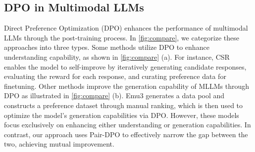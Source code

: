 \subsection{DPO in Multimodal LLMs}
Direct Preference Optimization (DPO) \citep{rafailov2024direct,zhang2024itercomp,yang2025supercorrect,yang2025reasonflux} enhances the performance of multimodal LLMs through the post-training process. In \cref{fig:compare}, we categorize these approaches into three types. Some methods \citep{zhou2024aligning, zhou2024calibrated, he2024self, zhang2024critic} utilize DPO to enhance understanding capability, as shown in \cref{fig:compare} (a). For instance, CSR \citep{zhou2024calibrated} enables the model to self-improve by iteratively generating candidate responses, evaluating the reward for each response, and curating preference data for finetuning. Other methods \citep{wang2024emu3} improve the generation capability of MLLMs through DPO as illustrated in \cref{fig:compare} (b). Emu3 \citep{wang2024emu3} generates a data pool and constructs a preference dataset through manual ranking, which is then used to optimize the model's generation capabilities via DPO. However, these models focus exclusively on enhancing either understanding or generation capabilities. In contrast, our approach uses Pair-DPO to effectively narrow the gap between the two, achieving mutual improvement.